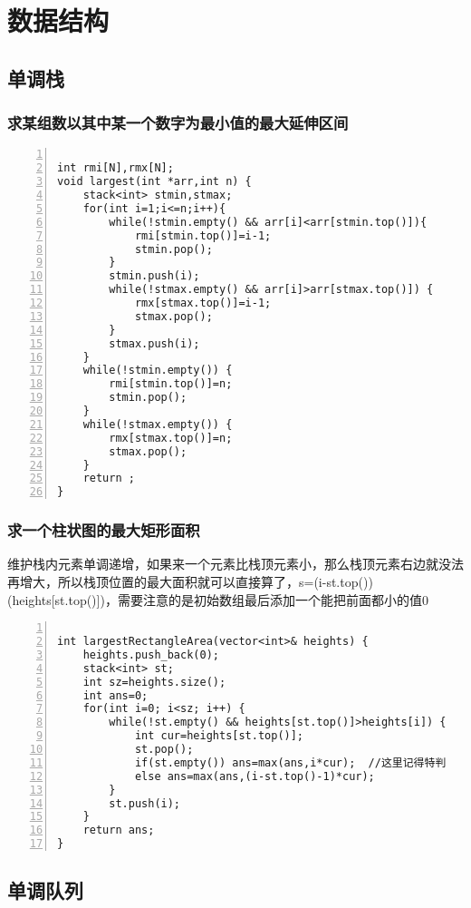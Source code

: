 \section{数据结构}

\subsection{单调栈}

\subsubsection{求某组数以其中某一个数字为最小值的最大延伸区间}

\begin{lstlisting}[language={[ANSI]C},numbers=left]

int rmi[N],rmx[N];
void largest(int *arr,int n) {
    stack<int> stmin,stmax;
    for(int i=1;i<=n;i++){
    	while(!stmin.empty() && arr[i]<arr[stmin.top()]){
    		rmi[stmin.top()]=i-1;
    		stmin.pop();
		}
    	stmin.push(i);
    	while(!stmax.empty() && arr[i]>arr[stmax.top()]) {
    		rmx[stmax.top()]=i-1;
    		stmax.pop();
		}
		stmax.push(i);
	}
	while(!stmin.empty()) {
		rmi[stmin.top()]=n;
		stmin.pop();
	}
	while(!stmax.empty()) {
		rmx[stmax.top()]=n;
		stmax.pop();
	}
	return ;
}
\end{lstlisting}

\subsubsection{求一个柱状图的最大矩形面积}

维护栈内元素单调递增，如果来一个元素比栈顶元素小，那么栈顶元素右边就没法再增大，所以栈顶位置的最大面积就可以直接算了，s=(i-st.top())\*(heights[st.top()])，需要注意的是初始数组最后添加一个能把前面都小的值0
\begin{lstlisting}[language={[ANSI]C},numbers=left]

int largestRectangleArea(vector<int>& heights) {
    heights.push_back(0);
    stack<int> st;
    int sz=heights.size();
    int ans=0;
    for(int i=0; i<sz; i++) {
        while(!st.empty() && heights[st.top()]>heights[i]) {
            int cur=heights[st.top()];
            st.pop();
            if(st.empty()) ans=max(ans,i*cur);	//这里记得特判
            else ans=max(ans,(i-st.top()-1)*cur);
        }
        st.push(i);
    }
    return ans;
}
\end{lstlisting}

\subsection{单调队列}

